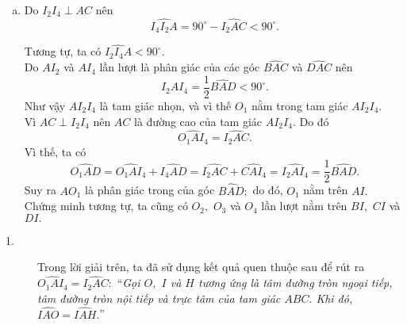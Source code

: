 \begin{bt}
{\begin{enumerate}[a)]
			\item Do $I_2I_4 \perp AC$ nên
			$$ \widehat{I_4I_2A}= 90^{\circ} - \widehat{I_2AC} < 90^{\circ}.$$
			\begin{center}
			\end{center}
			Tương tự, ta có $\widehat{I_2I_4A} < 90^{\circ}.$\\
			Do  $AI_2$ và $AI_4$ lần lượt là phân giác của các góc $\widehat{BAC}$ và $\widehat{DAC}$ nên
			$$\widehat{I_2AI_4} =\dfrac{1}{2}\widehat{BAD} < 90^{\circ}.$$
			Như vậy $AI_2I_4$ là tam giác nhọn, và vì thế $O_1$ nằm trong tam giác $AI_2I_4.$\\
			Vì $AC \perp I_2I_4$ nên $AC$ là đường cao của tam giác $AI_2I_4.$ Do đó
			$$\widehat{O_1AI_4}= \widehat{I_2AC}.$$
			Vì thế, ta có
			$$\widehat{O_1AD}= \widehat{O_1AI_4} + \widehat{I_4AD}=\widehat{I_2AC} + \widehat{CAI_4}=\widehat{I_2AI_4}=\dfrac{1}{2}\widehat{BAD}.$$
			Suy ra $AO_1$ là phân giác trong của góc $\widehat{BAD};$ do đó, $O_1$ nằm trên $AI.$\\
			Chứng minh tương tự, ta cũng có $O_2,$ $ O_3$ và $O_4$ lần lượt nằm trên $BI,$ $ CI$ và $DI.$
		\end{enumerate}		
		\begin{nx}\hfill
			\begin{description}
				\item[1.] Trong lời giải trên, ta đã sử dụng kết quả quen thuộc sau để rút ra $\widehat{O_1AI_4} = \widehat{I_2AC}:$
				``\textit{Gọi $O,$ $ I$ và $H$ tương ứng là tâm đường tròn ngoại tiếp, tâm đường tròn nội tiếp và trực tâm của tam giác $ABC.$ Khi đó, $\widehat{IAO}=\widehat{IAH}.$}''

\end{description}
\end{nx}}
\end{bt}
